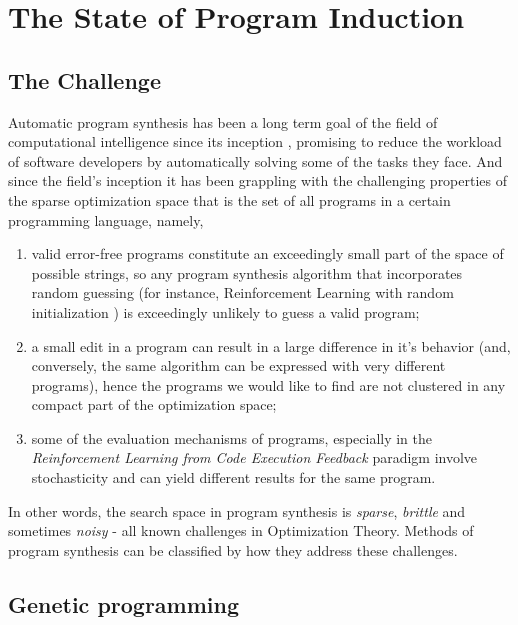\chapter{The State of Program Induction}
\label{ch:ps-methods}

\section{The Challenge}
\label{sec:ps-challenge}

Automatic program synthesis has been a long term goal of the field of computational intelligence since its inception \cite{mannaAutomaticProgramSynthesis1971}, promising to reduce the workload of software developers by automatically solving some of the tasks they face.
And since the field's inception it has been grappling with the challenging properties of the sparse optimization space \cite{alurSyntaxguidedSynthesis2013, davidProgramSynthesisChallenges2017} that is the set of all programs in a certain programming language, namely, 
\begin{enumerate}
    \item valid error-free programs constitute an exceedingly small part of the space of possible strings, so any program synthesis algorithm that incorporates random guessing (for instance, Reinforcement Learning with random initialization \cite{suttonReinforcementLearningSecond2018}) is exceedingly unlikely to guess a valid program;
    \item a small edit in a program can result in a large difference in it's behavior (and, conversely, the same algorithm can be expressed with very different programs), hence the programs we would like to find are not clustered in any compact part of the optimization space;
    \item some of the evaluation mechanisms of programs, especially in the \emph{Reinforcement Learning from Code Execution Feedback} paradigm involve stochasticity and can yield different results for the same program.
\end{enumerate}

In other words, the search space in program synthesis is \emph{sparse}, \emph{brittle} and sometimes \emph{noisy} \cite{arnoldNoisyOptimizationEvolution2002} - all known challenges in Optimization Theory.
Methods of program synthesis can be classified by how they address these challenges.

\newpage
\section{Genetic programming}
\label{sec:gp}

